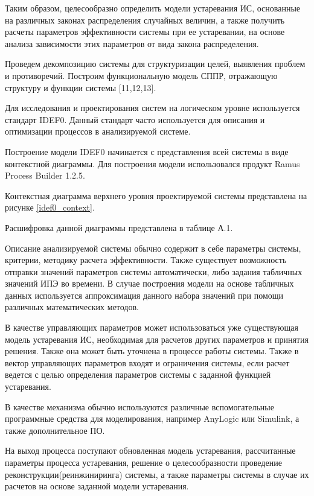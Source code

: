 Таким образом, целесообразно определить модели устаревания ИС, основанные на различных законах распределения случайных величин, а также получить расчеты параметров эффективности системы при ее устаревании, на основе анализа зависимости этих параметров от вида закона распределения.

Проведем декомпозицию системы для структуризации целей, выявления проблем и противоречий. 
Построим функциональную модель СППР, отражающую структуру и функции системы [11,12,13]. 

Для исследования и проектирования систем на логическом уровне используется стандарт IDEF0. 
Данный стандарт часто используется для описания и оптимизации процессов в анализируемой системе. 

Построение модели IDEF0 начинается с представления всей системы в виде контекстной диаграммы.
Для построения модели использовался продукт Ramus Process Builder 1.2.5. 

Контекстная диаграмма верхнего уровня проектируемой системы представлена на рисунке \ref{idef0_context}.


Расшифровка данной диаграммы представлена в таблице А.1.

Описание анализируемой системы обычно содержит в себе параметры системы, критерии, методику расчета эффективности. 
Также существует возможность отправки значений параметров системы автоматически, либо задания табличных значений ИПЭ во времени. 
В случае построения модели на основе табличных данных используется аппроксимация данного набора значений при помощи различных математических методов.


В качестве управляющих параметров может использоваться уже существующая модель устаревания ИС, необходимая для расчетов других параметров и принятия решения. 
Также она может быть уточнена в процессе работы системы. 
Также в вектор управляющих параметров входят и ограничения системы, если расчет ведется с целью определения параметров системы с заданной функцией устаревания.

В качестве механизма обычно используются различные вспомогательные программные средства для моделирования, например AnyLogic или Simulink, а также дополнительное ПО.

На выход процесса поступают обновленная модель устаревания, рассчитанные параметры процесса устаревания, решение о целесообразности проведение реконструкции(реинжиниринга) системы, а также параметры системы в случае их расчетов на основе заданной модели устаревания.

